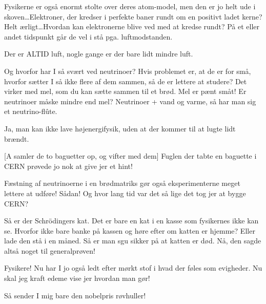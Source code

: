 \documentclass[a4paper,11pt]{article}
\begin{document}
\begin{sketch}
 Fysikerne er også enormt stolte over deres atom-model, men
den er jo helt ude i skoven\ldots Elektroner, der kredser i perfekte
baner rundt om en positivt ladet kerne? Helt ærligt\ldots Hvordan kan
elektronerne blive ved med at kredse rundt? På et eller andet
tidspunkt går de vel i stå pga. luftmodstanden.


 Der er ALTID luft, nogle gange er der bare lidt mindre luft.


 Og hvorfor har I så svært ved neutrinoer?  Hvis problemet er,
at de er for små, hvorfor sætter I så ikke flere af dem sammen, så de
er lettere at studere? Det virker med mel, som du kan sætte sammen til
et brød. Mel er pænt småt! Er neutrinoer måske mindre end mel?
Neutrinoer + vand og varme, så har man sig et neutrino-flûte.


 Ja, man kan ikke lave højenergifysik, uden at der kommer
til at lugte lidt brændt.

[A samler de to baguetter op, og vifter med dem] Fuglen der
tabte en baguette i CERN prøvede jo nok at give jer et hint!

 Fæstning af neutrinoerne i en brødmatriks gør også
eksperimenterne meget lettere at udføre!  Sådan!
Og hvor lang tid var det så lige det tog jer at bygge CERN?

 Så er der Schrödingers kat. Det er bare en kat i en kasse som
fysikernes ikke kan se. Hvorfor ikke bare banke på kassen og høre
efter om katten er hjemme? Eller lade den stå i en måned. Så er man sgu sikker på at
katten er død.  Nå, den sagde
altså noget til generalprøven!

 Fysikere! Nu har I jo også ledt efter mørkt stof i hvad der føles som evigheder. Nu skal jeg kraft edeme vise jer hvordan man gør! 


  Så sender I mig bare den nobelpris røvhuller!

\end{sketch}
\end{document}
